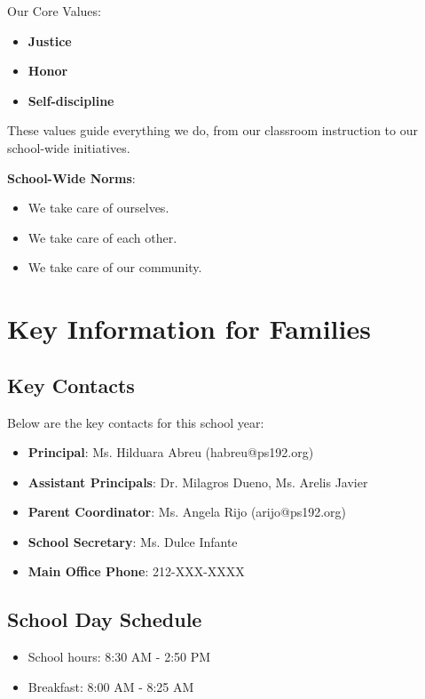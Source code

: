 \documentclass[11pt]{article}
\begin{document}
Our Core Values:
\begin{itemize}
\item \textbf{\textbf{Justice}}
\item \textbf{\textbf{Honor}}
\item \textbf{\textbf{Self-discipline}}
\end{itemize}

These values guide everything we do, from our classroom instruction to our school-wide initiatives.

\textbf{\textbf{School-Wide Norms}}:
\begin{itemize}
\item We take care of ourselves.
\item We take care of each other.
\item We take care of our community.
\end{itemize}

\section{Key Information for Families}
\label{sec:org3ff6ab0}
\subsection{Key Contacts}
\label{sec:org464e1dd}
Below are the key contacts for this school year:

\begin{itemize}
\item \textbf{\textbf{Principal}}: Ms. Hilduara Abreu (habreu@ps192.org)
\item \textbf{\textbf{Assistant Principals}}: Dr. Milagros Dueno, Ms. Arelis Javier
\item \textbf{\textbf{Parent Coordinator}}: Ms. Angela Rijo (arijo@ps192.org)
\item \textbf{\textbf{School Secretary}}: Ms. Dulce Infante
\item \textbf{\textbf{Main Office Phone}}: 212-XXX-XXXX
\end{itemize}

\subsection{School Day Schedule}
\label{sec:org77d92b9}
\begin{itemize}
\item School hours: 8:30 AM - 2:50 PM
\item Breakfast: 8:00 AM - 8:25 AM
\end{itemize}
\end{document}
